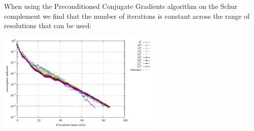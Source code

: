 When using the Preconditioned Conjugate Gradients algorithm on the Schur complement 
we find that the number of iterations is constant across the range of resolutions
that can be used:

\begin{center}
\includegraphics[width=8cm]{python_codes/fieldstone_82/RESULTS/bench5/solver_convergence.pdf}
\end{center}

